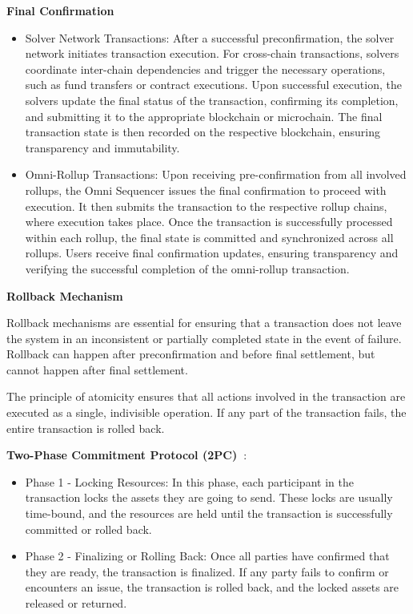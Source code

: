 \textbf{Final Confirmation} 
\begin{itemize}
    \item Solver Network Transactions: After a successful preconfirmation, the solver network initiates transaction execution. For cross-chain transactions, solvers coordinate inter-chain dependencies and trigger the necessary operations, such as fund transfers or contract executions. Upon successful execution, the solvers update the final status of the transaction, confirming its completion, and submitting it to the appropriate blockchain or microchain. The final transaction state is then recorded on the respective blockchain, ensuring transparency and immutability.
    
    \item Omni-Rollup Transactions: Upon receiving pre-confirmation from all involved rollups, the Omni Sequencer issues the final confirmation to proceed with execution. It then submits the transaction to the respective rollup chains, where execution takes place. Once the transaction is successfully processed within each rollup, the final state is committed and synchronized across all rollups. Users receive final confirmation updates, ensuring transparency and verifying the successful completion of the omni-rollup transaction.
\end{itemize}


\textbf{Rollback Mechanism}

Rollback mechanisms are essential for ensuring that a transaction does not leave the system in an inconsistent or partially completed state in the event of failure. Rollback can happen after preconfirmation and before final settlement, but cannot happen after final settlement. 

The principle of atomicity ensures that all actions involved in the transaction are executed as a single, indivisible operation. If any part of the transaction fails, the entire transaction is rolled back.

\textbf{Two-Phase Commitment Protocol (2PC)~\cite{2pc}}:

\begin{itemize}
    \item Phase 1 - Locking Resources: In this phase, each participant in the transaction locks the assets they are going to send. These locks are usually time-bound, and the resources are held until the transaction is successfully committed or rolled back.
    \item Phase 2 - Finalizing or Rolling Back: Once all parties have confirmed that they are ready, the transaction is finalized. If any party fails to confirm or encounters an issue, the transaction is rolled back, and the locked assets are released or returned.
\end{itemize}
    
